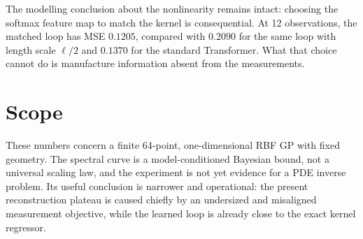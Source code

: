 \documentclass[10pt]{article}
\begin{document}
The modelling conclusion about the nonlinearity remains intact: choosing the
softmax feature map to match the kernel is consequential.  At 12 observations,
the matched loop has MSE $0.1205$, compared with $0.2090$ for the same loop with
length scale $\ell/2$ and $0.1370$ for the standard Transformer.  What that
choice cannot do is manufacture information absent from the measurements.

\section{Scope}

These numbers concern a finite 64-point, one-dimensional RBF GP with fixed
geometry.  The spectral curve is a model-conditioned Bayesian bound, not a
universal scaling law, and the experiment is not yet evidence for a PDE
inverse problem.  Its useful conclusion is narrower and operational: the
present reconstruction plateau is caused chiefly by an undersized and
misaligned measurement objective, while the learned loop is already close to
the exact kernel regressor.
\end{document}
